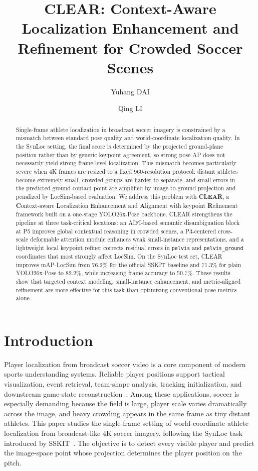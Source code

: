 \documentclass[runningheads]{llncs}
\title{CLEAR: Context-Aware Localization Enhancement and Refinement for Crowded Soccer Scenes}
\author{Yuhang DAI\inst{1} \and Qing LI\inst{1}}
\institute{Department of Computing, The Hong Kong Polytechnic University\\
\email{yuhang.dai@connect.polyu.hk}}
\begin{document}
\maketitle

\begin{abstract}
Single-frame athlete localization in broadcast soccer imagery is constrained by a mismatch between standard pose quality and world-coordinate localization quality. In the SynLoc setting, the final score is determined by the projected ground-plane position rather than by generic keypoint agreement, so strong pose AP does not necessarily yield strong frame-level localization. This mismatch becomes particularly severe when 4K frames are resized to a fixed 960-resolution protocol: distant athletes become extremely small, crowded groups are harder to separate, and small errors in the predicted ground-contact point are amplified by image-to-ground projection and penalized by LocSim-based evaluation. We address this problem with \textbf{CLEAR}, a \textbf{C}ontext-aware \textbf{L}ocalization \textbf{E}nhancement and \textbf{A}lignment with keypoint \textbf{R}efinement framework built on a one-stage YOLO26x-Pose backbone. CLEAR strengthens the pipeline at three task-critical locations: an AIFI-based semantic disambiguation block at P5 improves global contextual reasoning in crowded scenes, a P3-centered cross-scale deformable attention module enhances weak small-instance representations, and a lightweight local keypoint refiner corrects residual errors in \texttt{pelvis} and \texttt{pelvis\_ground} coordinates that most strongly affect LocSim. On the SynLoc test set, CLEAR improves mAP-LocSim from 76.2\% for the official SSKIT baseline and 71.3\% for plain YOLO26x-Pose to 82.2\%, while increasing frame accuracy to 50.7\%. These results show that targeted context modeling, small-instance enhancement, and metric-aligned refinement are more effective for this task than optimizing conventional pose metrics alone.
\end{abstract}

\section{Introduction}
\label{sec:intro}

Player localization from broadcast soccer video is a core component of modern sports understanding systems. Reliable player positions support tactical visualization, event retrieval, team-shape analysis, tracking initialization, and downstream game-state reconstruction~\cite{deliege2021soccernetv2,cioppa2022scaling,somers2024soccernet}. Among these applications, soccer is especially demanding because the field is large, player scale varies dramatically across the image, and heavy crowding appears in the same frame as tiny distant athletes. This paper studies the single-frame setting of world-coordinate athlete localization from broadcast-like 4K soccer imagery, following the SynLoc task introduced by SSKIT~\cite{ardo2025}. The objective is to detect every visible player and predict the image-space point whose projection determines the player position on the pitch.
\end{document}
